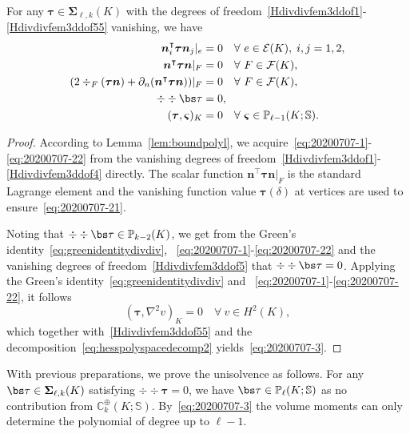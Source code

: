 \begin{lemma}\label{lem:vanishdof}
For any $\boldsymbol \tau\in\boldsymbol \Sigma_{\ell,k}(K)$ with the degrees of freedom~\eqref{Hdivdivfem3ddof1}-\eqref{Hdivdivfem3ddof55} vanishing, we have 
\begin{align}
\label{eq:20200707-1}
 \boldsymbol  n_i^{\intercal}\boldsymbol\tau\boldsymbol  n_j|_e&=0\quad\forall~e\in\mathcal E(K),\; i,j=1,2,\\
\label{eq:20200707-21}
\boldsymbol  n^{\intercal}\boldsymbol\tau\boldsymbol  n|_F &= 0\quad\forall~F\in\mathcal F(K),\\
\label{eq:20200707-22}
(2\div_F(\boldsymbol\tau \boldsymbol n)+ \partial_n(\boldsymbol n^{\intercal} \boldsymbol \tau\boldsymbol n))|_F & = 0\quad\forall~F\in\mathcal F(K),
\\
\notag%
\div\div \bs\tau &= 0,\\
\label{eq:20200707-3}
(\boldsymbol \tau, \boldsymbol \varsigma)_K &=0 \quad\forall~\boldsymbol \varsigma\in\mathbb P_{\ell-1}(K;\mathbb S).
\end{align}
\end{lemma}
\begin{proof}
According to Lemma~\ref{lem:boundpolyl}, we acquire~\eqref{eq:20200707-1}-\eqref{eq:20200707-22} from the vanishing degrees of freedom~\eqref{Hdivdivfem3ddof1}-\eqref{Hdivdivfem3ddof4} directly. The scalar function $\boldsymbol  n^{\intercal}\boldsymbol\tau\boldsymbol  n|_F$ is the standard Lagrange element and the vanishing function value $\boldsymbol \tau(\delta)$ at vertices are used to ensure~\eqref{eq:20200707-21}. 

Noting that
$\div\div\bs\tau\in \mathbb P_{k-2}(K)$, 
we get from the Green's identity~\eqref{eq:greenidentitydivdiv}, ~\eqref{eq:20200707-1}-\eqref{eq:20200707-22} and the vanishing degrees of freedom~\eqref{Hdivdivfem3ddof5} that $\div\div\bs\tau=0$. Applying the Green's identity~\eqref{eq:greenidentitydivdiv} and ~\eqref{eq:20200707-1}-\eqref{eq:20200707-22}, it follows
\[
(\boldsymbol \tau, \nabla^2v)_K=0\quad\forall~v\in H^2(K),
\]
which together with~\eqref{Hdivdivfem3ddof55} and the decomposition~\eqref{eq:hesspolyspacedecomp2} yields~\eqref{eq:20200707-3}.
\end{proof}

With previous preparations, 
we prove the unisolvence as follows. 
For any $\bs\tau\in\boldsymbol \Sigma_{\ell,k}(K)$ satisfying $\div\div\boldsymbol \tau=0$, we have $\bs\tau\in\mathbb P_{\ell}(K;\mathbb S)$ as no contribution from $\mathbb C_k^{\oplus}(K;\mathbb S)$. By~\eqref{eq:20200707-3} the volume moments can only determine the polynomial of degree up to $\ell-1$. 

